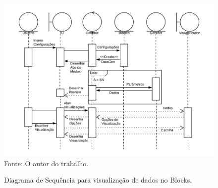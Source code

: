 \documentclass[
	12pt,				%
	openright,			%
	oneside,			%
	a4paper,			%
	english,			%
	brazil				%
	]{abntex2}
\begin{document}
	\begin{figure}[h!]
		\centering
		\caption{Diagrama de Sequência para visualização de dados no Blocks.}
		\includegraphics[width=\linewidth]{./figures/prototipo/DiagramadeSequenciaVisApplication.png}
		\label{fig:DiagramadeSequenciaVisApplication}
		\footnotesize Fonte: O autor do trabalho.
	\end{figure}
	\pagebreak
\end{document}
